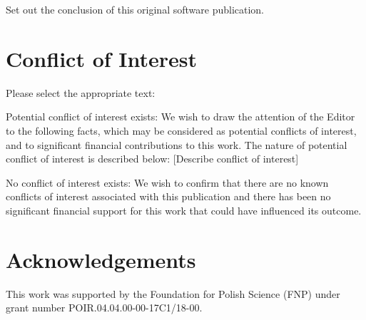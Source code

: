 \documentclass[preprint,12pt, a4paper]{elsarticle}
\newcommand{\1}{{\rm 1\hspace{-0.9mm}l}}
\begin{document}
Set out the conclusion of this original software publication.

\section{Conflict of Interest}
Please select the appropriate text:

Potential conflict of interest exists:
We wish to draw the attention of the Editor to the following facts, which may be considered as potential conflicts of interest, and to significant financial contributions to this work. The nature of potential conflict of interest is described below: [Describe conflict of interest]

No conflict of interest exists:
We wish to confirm that there are no known conflicts of interest associated with this publication and there has been no significant financial support for this work that could have influenced its outcome.


\section*{Acknowledgements}

This work was supported by the Foundation for Polish Science (FNP) under grant
number POIR.04.04.00-00-17C1/18-00.




%
%   
%  

\end{document}
